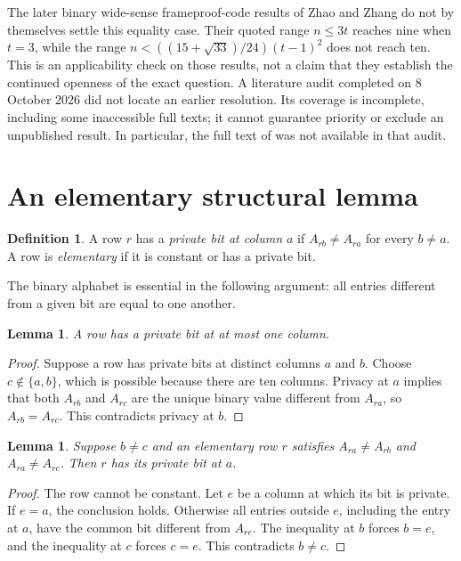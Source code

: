 \documentclass[11pt]{article}
\newtheorem{lemma}[theorem]{Lemma}
\theoremstyle{definition}
\newtheorem{definition}[theorem]{Definition}
\theoremstyle{remark}
\begin{document}
The later binary wide-sense frameproof-code results of Zhao and Zhang
\cite{wide2024} do not by themselves settle this equality case. Their
quoted range $n\leq3t$ reaches nine when $t=3$, while the range
$n<((15+\sqrt{33})/24)(t-1)^2$ does not reach ten. This is an
applicability check on those results, not a claim that they establish the
continued openness of the exact question. A literature audit completed
on 8 October 2026 did not locate an earlier resolution. Its coverage is
incomplete, including some inaccessible full texts; it cannot guarantee
priority or exclude an unpublished result. In particular, the full text
of \cite{sunwang2025} was not available in that audit.

\section{An elementary structural lemma}
\label{sec:structure}

\begin{definition}
A row $r$ has a \emph{private bit at column $a$} if
$A_{rb}\ne A_{ra}$ for every $b\ne a$. A row is \emph{elementary} if
it is constant or has a private bit.
\end{definition}

The binary alphabet is essential in the following argument: all entries
different from a given bit are equal to one another.

\begin{lemma}
\label{lem:private-unique}
A row has a private bit at at most one column.
\end{lemma}
\begin{proof}
Suppose a row has private bits at distinct columns $a$ and $b$. Choose
$c\notin\{a,b\}$, which is possible because there are ten columns.
Privacy at $a$ implies that both $A_{rb}$ and $A_{rc}$ are the unique
binary value different from $A_{ra}$, so $A_{rb}=A_{rc}$. This
contradicts privacy at $b$.
\end{proof}

\begin{lemma}
\label{lem:elementary-separator}
Suppose $b\ne c$ and an elementary row $r$ satisfies
$A_{ra}\ne A_{rb}$ and $A_{ra}\ne A_{rc}$. Then $r$ has its private
bit at $a$.
\end{lemma}
\begin{proof}
The row cannot be constant. Let $e$ be a column at which its bit is
private. If $e=a$, the conclusion holds. Otherwise all entries outside
$e$, including the entry at $a$, have the common bit different from
$A_{re}$. The inequality at $b$ forces $b=e$, and the inequality at
$c$ forces $c=e$. This contradicts $b\ne c$.
\end{proof}
\end{document}
